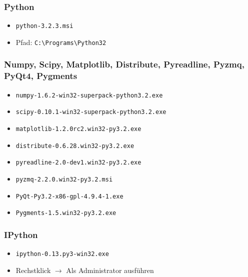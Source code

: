\subsubsection{Python}
\begin{itemize}
  \item \texttt{python-3.2.3.msi}
  \item Pfad: \verb|C:\Programs\Python32|
\end{itemize}

\subsubsection{Numpy, Scipy, Matplotlib, Distribute, Pyreadline, Pyzmq, PyQt4, Pygments}
\begin{itemize}
  \item \texttt{numpy-1.6.2-win32-superpack-python3.2.exe}
  \item \texttt{scipy-0.10.1-win32-superpack-python3.2.exe}
  \item \texttt{matplotlib-1.2.0rc2.win32-py3.2.exe}
  \item \texttt{distribute-0.6.28.win32-py3.2.exe}
  \item \texttt{pyreadline-2.0-dev1.win32-py3.2.exe}
  \item \texttt{pyzmq-2.2.0.win32-py3.2.msi}
  \item \texttt{PyQt-Py3.2-x86-gpl-4.9.4-1.exe}
  \item \texttt{Pygments-1.5.win32-py3.2.exe}
\end{itemize}

\subsubsection{IPython}
\begin{itemize}
  \item \texttt{ipython-0.13.py3-win32.exe}
  \item Rechstklick $\rightarrow$ Als Administrator ausführen
\end{itemize}

